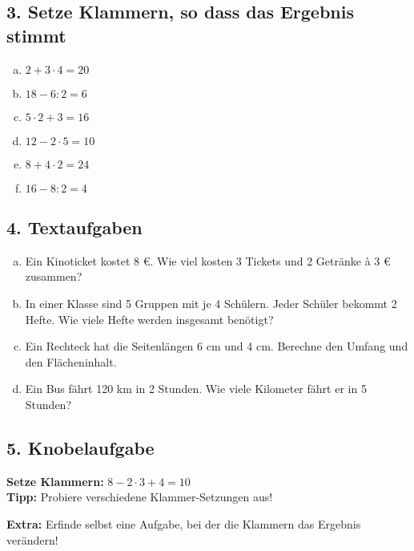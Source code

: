 \subsection*{3. Setze Klammern, so dass das Ergebnis stimmt}
\begin{enumerate}[a)]
    \item $2 + 3 \cdot 4 = 20$
    \item $18 - 6 : 2 = 6$
    \item $5 \cdot 2 + 3 = 16$
    \item $12 - 2 \cdot 5 = 10$
    \item $8 + 4 \cdot 2 = 24$
    \item $16 - 8 : 2 = 4$
\end{enumerate}

\subsection*{4. Textaufgaben}
\begin{enumerate}[a)]
    \item Ein Kinoticket kostet 8 €. Wie viel kosten 3 Tickets und 2 Getränke à 3 € zusammen?
    \item In einer Klasse sind 5 Gruppen mit je 4 Schülern. Jeder Schüler bekommt 2 Hefte. Wie viele Hefte werden insgesamt benötigt?
    \item Ein Rechteck hat die Seitenlängen 6 cm und 4 cm. Berechne den Umfang und den Flächeninhalt.
    \item Ein Bus fährt 120 km in 2 Stunden. Wie viele Kilometer fährt er in 5 Stunden?
\end{enumerate}

\subsection*{5. Knobelaufgabe}
\textbf{Setze Klammern:} $8 - 2 \cdot 3 + 4 = 10$\\
\textbf{Tipp:} Probiere verschiedene Klammer-Setzungen aus!

\vspace{1em}
\textbf{Extra:} Erfinde selbst eine Aufgabe, bei der die Klammern das Ergebnis verändern!